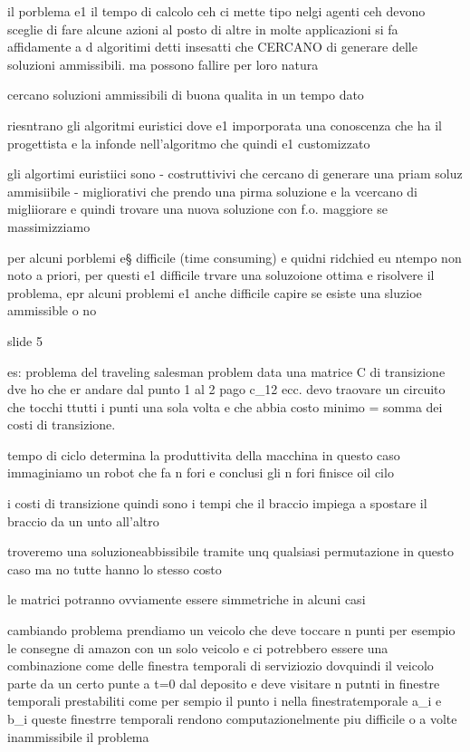 il porblema e1 il tempo di calcolo ceh ci mette tipo nelgi agenti ceh devono sceglie di fare alcune azioni al posto di altre 
in molte applicazioni si fa affidamente a d algoritimi detti insesatti che CERCANO di generare delle soluzioni ammissibili. ma possono fallire per loro natura

cercano soluzioni ammissibili di buona qualita in un tempo dato 

riesntrano gli algoritmi euristici dove e1 imporporata una conoscenza che ha il progettista e la infonde nell’algoritmo che quindi e1 customizzato 


gli algortimi euristiici sono
- costruttivivi che cercano di generare una priam soluz ammisiibile
- migliorativi che prendo una pirma soluzione e la vcercano di migliiorare e quindi trovare una nuova soluzione con f.o. maggiore se massimizziamo

per alcuni porblemi e§ difficile (time consuming) e quidni ridchied eu ntempo non noto a priori, per questi e1 difficile trvare una soluzoione ottima e risolvere il problema, epr alcuni problemi e1 anche difficile capire se esiste una sluzioe ammissible o no

slide 5


es:
problema del traveling salesman problem
data una matrice C di transizione dve ho che er andare dal punto 1 al 2 pago c_{12} ecc. devo traovare un circuito che tocchi ttutti i punti una sola volta e che abbia costo minimo = somma dei costi di transizione.

tempo di ciclo determina la produttivita della macchina in questo caso immaginiamo un robot che fa n fori e conclusi gli n fori finisce oil cilo

i costi di transizione quindi sono i tempi che il braccio impiega a spostare il braccio da un unto all’altro

troveremo una soluzioneabbissibile tramite unq qualsiasi permutazione in questo caso  ma no  tutte hanno lo stesso costo

le matrici potranno ovviamente essere simmetriche in alcuni casi



cambiando problema prendiamo un veicolo che deve toccare n punti per esempio le consegne di amazon con un solo veicolo e ci potrebbero essere una combinazione come delle finestra temporali di serviziozio dovquindi il veicolo parte da un certo punte a t=0 dal deposito e deve visitare n putnti in finestre temporali prestabiliti come per sempio il punto i nella finestratemporale a_i e b_i
queste finestrre temporali rendono computazionelmente piu difficile o a volte inammissibile il problema

